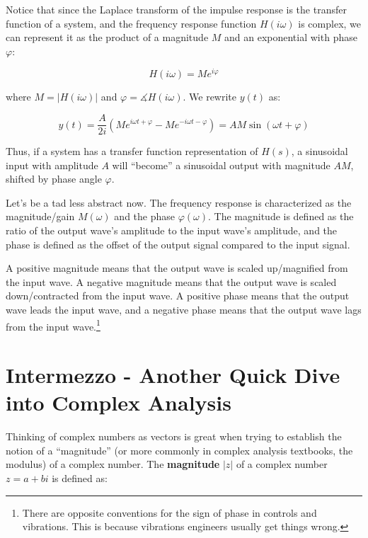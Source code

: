\documentclass[
  letterpaper,
  DIV=11,
  numbers=noendperiod]{scrreprt}
\begin{document}
Notice that since the Laplace transform of the impulse response is the
transfer function of a system, and the frequency response function
\(H(i\omega)\) is complex, we can represent it as the product of a
magnitude \(M\) and an exponential with phase \(\varphi\):

\[H(i\omega) = M e^{i\varphi}\]

where \(M = |H(i\omega)|\) and \(\varphi = \measuredangle H(i\omega)\).
We rewrite \(y(t)\) as:

\[y(t) = \frac{A}{2i} \left(M e^{i\omega t + \varphi} - M e^{-i \omega t - \varphi} \right) = AM \sin(\omega t + \varphi)\]

Thus, if a system has a transfer function representation of \(H(s)\), a
sinusoidal input with amplitude \(A\) will ``become'' a sinusoidal
output with magnitude \(AM\), shifted by phase angle \(\varphi\).

Let's be a tad less abstract now. The frequency response is
characterized as the magnitude/gain \(M(\omega)\) and the phase
\(\varphi(\omega)\). The magnitude is defined as the ratio of the output
wave's amplitude to the input wave's amplitude, and the phase is defined
as the offset of the output signal compared to the input signal.

A positive magnitude means that the output wave is scaled up/magnified
from the input wave. A negative magnitude means that the output wave is
scaled down/contracted from the input wave. A positive phase means that
the output wave leads the input wave, and a negative phase means that
the output wave lags from the input wave.\footnote{There are opposite
  conventions for the sign of phase in controls and vibrations. This is
  because vibrations engineers usually get things wrong.}

\hypertarget{intermezzo---another-quick-dive-into-complex-analysis}{%
\section*{Intermezzo - Another Quick Dive into Complex
Analysis}\label{intermezzo---another-quick-dive-into-complex-analysis}}


Thinking of complex numbers as vectors is great when trying to establish
the notion of a ``magnitude'' (or more commonly in complex analysis
textbooks, the modulus) of a complex number. The \textbf{magnitude}
\(|z|\) of a complex number \(z = a + bi\) is defined as:
\end{document}
